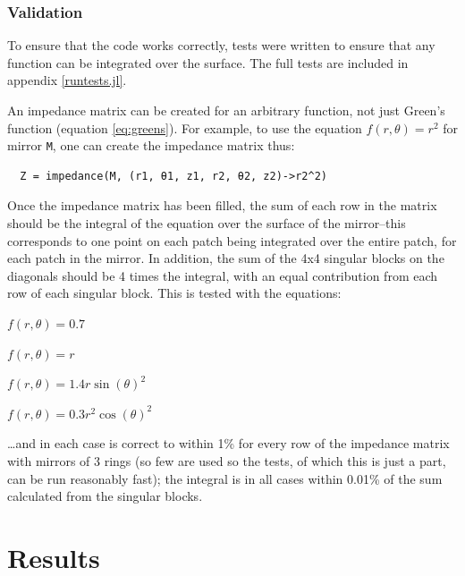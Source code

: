 \documentclass[etd,twoside,senior,noacknowledgments]{BYUPhys}
\begin{document}
\subsection{Validation} \label{sec:validation}

To ensure that the code works correctly, tests were written to ensure that any function can be integrated over the surface. The full tests are included in appendix \ref{runtests.jl}.

An impedance matrix can be created for an arbitrary function, not just Green's function (equation \ref{eq:greens}). For example, to use the equation $f\left(r, \theta\right) = r^2$ for mirror \texttt{M}, one can create the impedance matrix thus:

\begin{verbatim}
  Z = impedance(M, (r1, θ1, z1, r2, θ2, z2)->r2^2)
\end{verbatim}

Once the impedance matrix has been filled, the sum of each row in the matrix should be the integral of the equation over the surface of the mirror--this corresponds to one point on each patch being integrated over the entire patch, for each patch in the mirror. In addition, the sum of the 4x4 singular blocks on the diagonals should be 4 times the integral, with an equal contribution from each row of each singular block. This is tested with the equations:

$f\left(r, \theta\right) = 0.7$

$f\left(r, \theta\right) = r$

$f\left(r, \theta\right) = 1.4 r \sin\left(\theta\right)^2$

$f\left(r, \theta\right) = 0.3 r^2 \cos\left(\theta\right)^2$

\ldots and in each case is correct to within 1\% for every row of the impedance matrix with mirrors of 3 rings (so few are used so the tests, of which this is just a part, can be run reasonably fast); the integral is in all cases within 0.01\% of the sum calculated from the singular blocks.







\chapter{Results}\label{chap:results}
\end{document}
